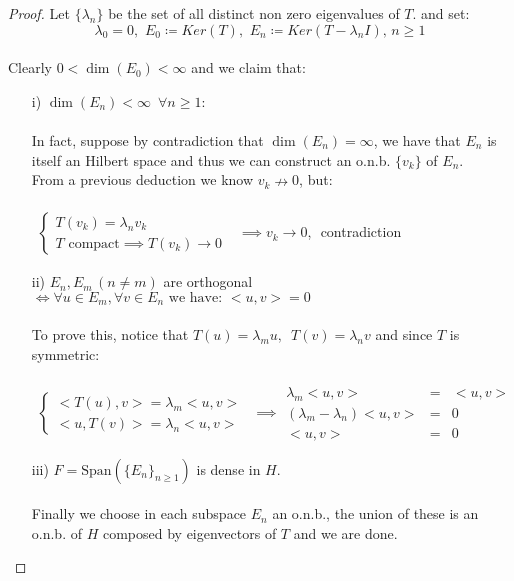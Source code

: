 \begin{proof}
Let $\{\lambda_n\}$ be the set of all distinct non zero eigenvalues of $T$.
and set: \\
\[\lambda_0 = 0,\,\, E_0 \coloneqq Ker(T),\,\, E_n \coloneqq Ker(T-\lambda_n I),\, n\geq1 \]\\
Clearly $0<\dim(E_0)<\infty$ and we claim that:

\begin{itemize}
    \item[i)]$\dim(E_n)<\infty \,\,\,\forall n\geq 1$:\\\\
        In fact, suppose by contradiction that $\dim(E_n)=\infty$, we have that $E_n$ is itself an Hilbert space and thus we can construct an o.n.b. $\{v_k\}$ of $E_n$. \\
        From a previous deduction we know $v_k \nrightarrow 0$, but:\\\\
        $\begin{aligned}
            \begin{cases}
                T(v_k)=\lambda_nv_k\\
                T  \mbox{ compact} \implies T(v_k) \to 0
            \end{cases}
        \end{aligned}$
        $\implies v_k \rightarrow 0$,\,\, contradiction
    \item[ii)] $E_n,E_m\,(n\neq m)$ are orthogonal $\iff \forall u\in E_m, \forall v\in E_n \mbox{ we have:  } <u,v>=0$ \\\\
        To prove this, notice that $T(u)=\lambda_m u,\,\,\, T(v) = \lambda_n v $ and since $T$ is symmetric:\\\\
        $\begin{aligned}
            \begin{cases}
                <T(u),v>=\lambda_m<u,v>\\
                <u,T(v)>=\lambda_n<u,v>
            \end{cases}
        \end{aligned}\implies
        \begin{array}{rcl}
            \lambda_m<u,v>& =&<u,v>\\
            (\lambda_m-\lambda_n)<u,v>&=&0\\
            <u,v>&=&0
        \end{array}$      
    \item[iii)] $F=\text{Span}(\{E_n\}_{n\geq 1})$ is dense in $H$.\\\\
        Finally we choose in each subspace $E_n$ an o.n.b., the union of these is an o.n.b. of $H$ composed by eigenvectors of $T$ and we are done.
\end{itemize}
\end{proof}
